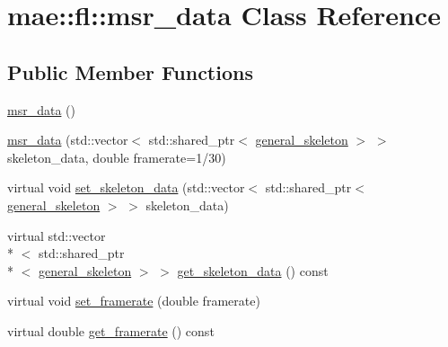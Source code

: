 \hypertarget{classmae_1_1fl_1_1msr__data}{\section{mae\-:\-:fl\-:\-:msr\-\_\-data Class Reference}
\label{classmae_1_1fl_1_1msr__data}
}
\subsection*{Public Member Functions}
\begin{DoxyCompactItemize}
\item 
\hyperlink{classmae_1_1fl_1_1msr__data_a04a33940291662dff6bec4cce88501f3}{msr\-\_\-data} ()
\item 
\hyperlink{classmae_1_1fl_1_1msr__data_a0d783c3ac81e1f89f9255a96c180ebae}{msr\-\_\-data} (std\-::vector$<$ std\-::shared\-\_\-ptr$<$ \hyperlink{classmae_1_1general__skeleton}{general\-\_\-skeleton} $>$ $>$ skeleton\-\_\-data, double framerate=1/30)
\item 
virtual void \hyperlink{classmae_1_1fl_1_1msr__data_a30457a519aa46fdc538ffaed95a4edbe}{set\-\_\-skeleton\-\_\-data} (std\-::vector$<$ std\-::shared\-\_\-ptr$<$ \hyperlink{classmae_1_1general__skeleton}{general\-\_\-skeleton} $>$ $>$ skeleton\-\_\-data)
\item 
virtual std\-::vector\\*
$<$ std\-::shared\-\_\-ptr\\*
$<$ \hyperlink{classmae_1_1general__skeleton}{general\-\_\-skeleton} $>$ $>$ \hyperlink{classmae_1_1fl_1_1msr__data_ae129ff522d210b14fb0edad99737b6b0}{get\-\_\-skeleton\-\_\-data} () const 
\item 
virtual void \hyperlink{classmae_1_1fl_1_1msr__data_a97c9a1269f902e2bb404200569de57dc}{set\-\_\-framerate} (double framerate)
\item 
virtual double \hyperlink{classmae_1_1fl_1_1msr__data_aac39b92714eba21f4797be87bbc9e588}{get\-\_\-framerate} () const 
\end{DoxyCompactItemize}


